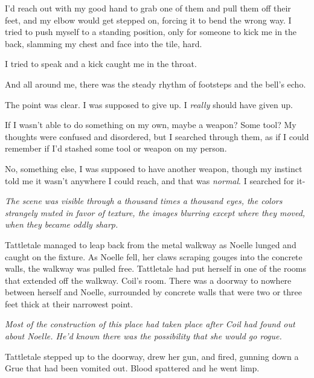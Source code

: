 I'd reach out with my good hand to grab one of them and pull them off their feet, and my elbow would get stepped on, forcing it to bend the wrong way.  I tried to push myself to a standing position, only for someone to kick me in the back, slamming my chest and face into the tile, hard.



I tried to speak and a kick caught me in the throat.



And all around me, there was the steady rhythm of footsteps and the bell's echo.



The point was clear.  I was supposed to give up.  I \emph{really} should have given up.



If I wasn't able to do something on my own, maybe a weapon?  Some tool?  My thoughts were confused and disordered, but I searched through them, as if I could remember if I'd stashed some tool or weapon on my person.



No, something else, I was supposed to have another weapon, though my instinct told me it wasn't anywhere I could reach, and that was \emph{normal}.  I searched for it-



\sectionbreak



\emph{The scene was visible through a thousand times a thousand eyes, the colors strangely muted in favor of texture, the images blurring except where they moved, when they became oddly sharp.}



Tattletale managed to leap back from the metal walkway as Noelle lunged and caught on the fixture.  As Noelle fell, her claws scraping gouges into the concrete walls, the walkway was pulled free.  Tattletale had put herself in one of the rooms that extended off the walkway.  Coil's room.  There was a doorway to nowhere between herself and Noelle, surrounded by concrete walls that were two or three feet thick at their narrowest point.



\emph{Most of the construction of this place had taken place after Coil had found out about Noelle.  He'd known there was the possibility that she would go rogue.}



Tattletale stepped up to the doorway, drew her gun, and fired, gunning down a Grue that had been vomited out.  Blood spattered and he went limp.



